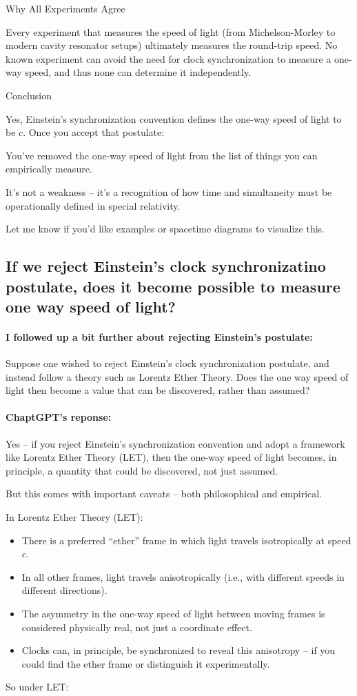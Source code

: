 \documentclass[a4paper]{article}
\theoremstyle{plain}
\theoremstyle{definition}
\begin{document}
Why All Experiments Agree

Every experiment that measures the speed of light (from
Michelson-Morley to modern cavity resonator setups) ultimately
measures the round-trip speed.  No known experiment can avoid the need
for clock synchronization to measure a one-way speed, and thus none
can determine it independently.

Conclusion

Yes, Einstein's synchronization convention defines the one-way speed
of light to be $c$.  Once you accept that postulate:

You've removed the one-way speed of light from the list of things you
can empirically measure.

It's not a weakness -- it's a recognition of how time and simultaneity
must be operationally defined in special relativity.

Let me know if you'd like examples or spacetime diagrams to visualize
this.


\subsection{If we reject Einstein's clock synchronizatino postulate, does it become possible to measure one way speed of light?}

\paragraph{I followed up a bit further about rejecting Einstein's postulate:}

Suppose one wished to reject Einstein's clock synchronization
postulate, and instead follow a theory such as Lorentz Ether Theory.
Does the one way speed of light then become a value that can be
discovered, rather than assumed?

\paragraph{ChaptGPT's reponse:}

Yes -- if you reject Einstein's synchronization convention and adopt a
framework like Lorentz Ether Theory (LET), then the one-way speed of
light becomes, in principle, a quantity that could be discovered, not
just assumed.

But this comes with important caveats -- both philosophical and
empirical.

In Lorentz Ether Theory (LET):
\begin{itemize}
\item There is a preferred ``ether'' frame in which light travels
  isotropically at speed $c$.
\item In all other frames, light travels anisotropically (i.e., with
  different speeds in different directions).
\item The asymmetry in the one-way speed of light between moving
  frames is considered physically real, not just a coordinate effect.
\item Clocks can, in principle, be synchronized to reveal this
  anisotropy -- if you could find the ether frame or distinguish it
  experimentally.
\end{itemize}
So under LET:
\end{document}
